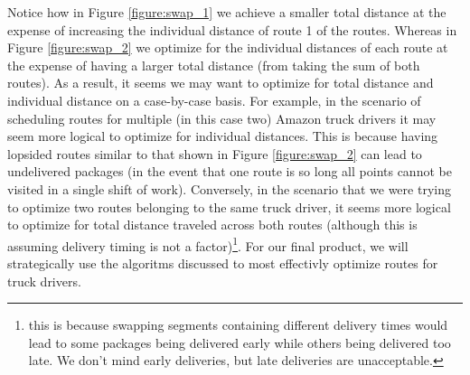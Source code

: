 \documentclass[letterpaper]{article}
\begin{document}
\begin{figure}[h]
\begin{minipage}{0.45\linewidth}
        \end{minipage}
    \end{figure}

    \newpage
    Notice how in Figure \ref*{figure:swap_1} we achieve a smaller total distance at the expense of increasing the individual distance of route 1 of the routes. Whereas in Figure \ref*{figure:swap_2} we optimize for the individual distances of each route at the expense of having a larger total distance (from taking the sum of both routes). As a result, it seems we may want to optimize for total distance and individual distance on a case-by-case basis. For example, in the scenario of scheduling routes for multiple (in this case two) Amazon truck drivers it may seem more logical to optimize for individual distances. This is because having lopsided routes similar to that shown in Figure \ref*{figure:swap_2} can lead to undelivered packages (in the event that one route is so long all points cannot be visited in a single shift of work). Conversely, in the scenario that we were trying to optimize two routes belonging to the same truck driver, it seems more logical to optimize for total distance traveled across both routes (although this is assuming delivery timing is not a factor)\footnote{this is because swapping segments containing different delivery times would lead to some packages being delivered early while others being delivered too late. We don't mind early deliveries, but late deliveries are unacceptable.}. For our final product, we will strategically use the algoritms discussed to most effectivly optimize routes for truck drivers.
    
\end{document}
